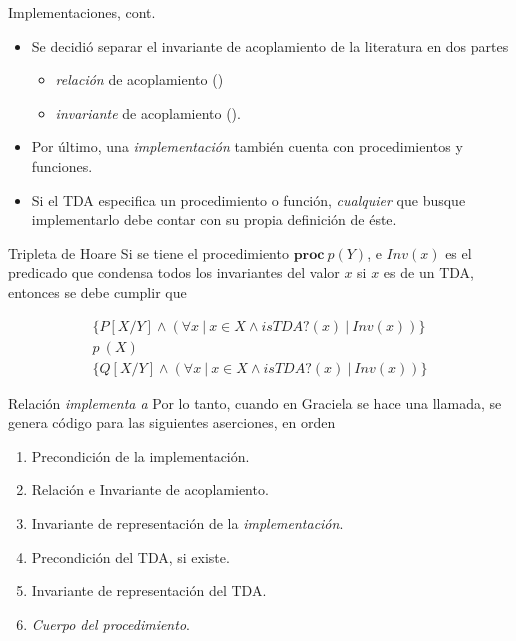 \begin{frame}{Implementaciones, cont.}
\begin{itemize}
    \item Se decidió separar el invariante de acoplamiento de la literatura en dos partes
    \begin{itemize}
      \item \textit{relación} de acoplamiento ()
      \item \textit{invariante} de acoplamiento ().
    \end{itemize}
  \item Por último, una \textit{implementación} también cuenta con procedimientos y funciones. 
  \item Si el TDA especifica un procedimiento o función, \textit{cualquier}  que busque implementarlo debe contar con su propia definición de éste.
\end{itemize}
\end{frame}

\begin{frame}{Tripleta de Hoare}
Si se tiene el procedimiento $\textbf{proc}\ p (Y)$, e $Inv(x)$ es el predicado que condensa todos los
invariantes del valor $x$ si $x$ es de un TDA, entonces se debe cumplir que

\begin{equation*} \label{eqn:tdatriple}
\begin{gathered}
  \{ P[X/Y] \land (\forall x\ |\ x \in X \land isTDA?(x)\ |\ Inv(x) )\}\\
  p\ (X)\\
  \{ Q[X/Y] \land (\forall x\ |\ x \in X \land isTDA?(x)\ |\ Inv(x) )\}
\end{gathered}
\end{equation*}
\end{frame}

\begin{frame}{Relación \textit{implementa a}}
Por lo tanto, cuando en Graciela se hace una llamada, se genera código para las siguientes aserciones, en orden

\begin{enumerate}
  \item Precondición de la implementación.

  \item Relación e Invariante de acoplamiento.

  \item Invariante de representación de la \textit{implementación}.

  \item Precondición del TDA, si existe.

  \item Invariante de representación del TDA.

  \item \textit{Cuerpo del procedimiento}.


\end{enumerate}
\end{frame}

